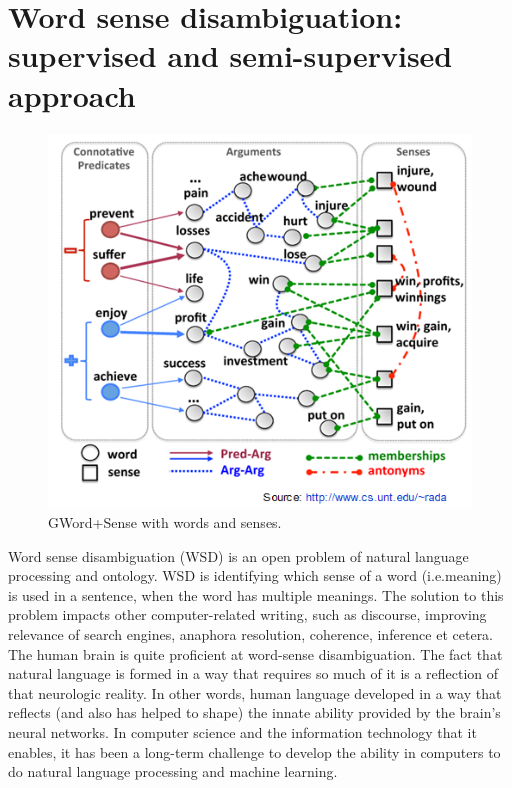 \section*{Word sense disambiguation: supervised and semi-supervised approach}
\begin{figure}[tbh]
	\begin{center}
		\includegraphics[width=\columnwidth]{union(WSD)}
	\end{center}
	\caption{GWord+Sense with words and senses. \label{fig1}}
\end{figure}
Word sense disambiguation (WSD) is an open problem of natural language processing and ontology. WSD is identifying which sense of a word (i.e.meaning) is used in a sentence, when the word has multiple meanings. The solution to this problem impacts other computer-related writing, such as discourse, improving relevance of search engines, anaphora resolution, coherence, inference et cetera.
The human brain is quite proficient at word-sense disambiguation. The fact that natural language is formed in a way that requires so much of it is a reflection of that neurologic reality. In other words, human language developed in a way that reflects (and also has helped to shape) the innate ability provided by the brain's neural networks. In computer science and the information technology that it enables, it has been a long-term challenge to develop the ability in computers to do natural language processing and machine learning.
